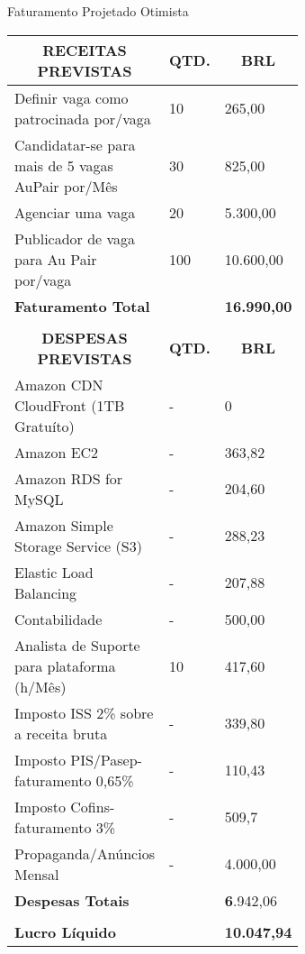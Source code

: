\begin{enumerate}
    \begin{quadro}[H]
    \caption{Faturamento Projetado Otimista}
    \label{faturamento-projetado-otimista}
    	\centering\footnotesize
        \begin{tabular}{|p{0.50\linewidth} | p{0.04\linewidth} |  p{0.10\linewidth} |}  \hline

        \multicolumn{1}{|c|}{\textbf{RECEITAS PREVISTAS}} &
        \multicolumn{1}{|c|}{\textbf{QTD.}} &
        \multicolumn{1}{|c|}{\textbf{BRL}} \\ \hline


    Definir vaga como patrocinada por/vaga  & 10 & 265,00      \\ \hline
    Candidatar-se para mais de 5 vagas AuPair por/Mês     &  30 & 825,00     \\ \hline
    Agenciar uma vaga             &  20  & 5.300,00         \\ \hline
    Publicador de vaga para Au Pair por/vaga     & 100  &   10.600,00     \\ \hline
    {\textbf{Faturamento Total}}   &   &   {\textbf{16.990,00}}           \\  \hline 


    &   &        \\ \hline
    \multicolumn{1}{|c|}{\textbf{DESPESAS PREVISTAS}} &
    \multicolumn{1}{|c|}{\textbf{QTD.}} &
    \multicolumn{1}{|c|}{\textbf{BRL}} \\ \hline

    Amazon CDN CloudFront (1TB Gratuíto) & - & 0 \\ \hline 
    Amazon EC2 & - & 363,82\\ \hline
    Amazon RDS for MySQL & - & 204,60 \\ \hline
    Amazon Simple Storage Service (S3) & - & 288,23 \\ \hline
    Elastic Load Balancing & - & 207,88 \\ \hline
    Contabilidade & - & 500,00 \\ \hline
    Analista de Suporte para plataforma (h/Mês) & 10 & 417,60  \\ \hline
    Imposto ISS 2\% sobre a receita bruta & - & 339,80  \\ \hline
    Imposto PIS/Pasep-faturamento 0,65\% & - & 110,43  \\ \hline
    Imposto Cofins-faturamento 3\% & - & 509,7  \\ \hline
    Propaganda/Anúncios Mensal    & - &  4.000,00  \\ \hline
    
    
    {\textbf{Despesas Totais}}   &   &   {\textbf6.942,06}}           \\  \hline 


        & &   \\  \hline   
    {\textbf{Lucro Líquido}}   &   &   {\textbf{10.047,94}}           \\  \hline 

        \end{tabular}
    \end{quadro}
\end{enumerate}

